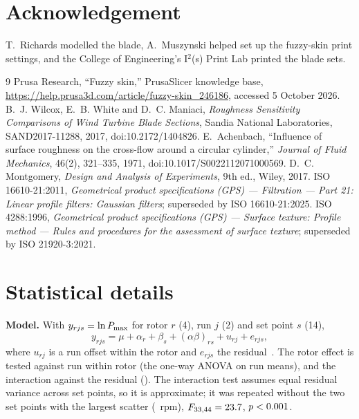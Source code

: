 \documentclass[11pt]{article}
\begin{document}
\section*{Acknowledgement}
T.~Richards modelled the blade, A.~Muszynski helped set up the fuzzy-skin print settings, and the
College of Engineering's I$^2$(s) Print Lab printed the blade sets.

{\small
\begin{thebibliography}{9}
 Prusa Research, ``Fuzzy skin,'' PrusaSlicer knowledge base,
\url{https://help.prusa3d.com/article/fuzzy-skin_246186}, accessed 5 October 2026.
 B.~J. Wilcox, E.~B. White and D.~C. Maniaci, \emph{Roughness Sensitivity
Comparisons of Wind Turbine Blade Sections}, Sandia National Laboratories, SAND2017-11288, 2017,
doi:10.2172/1404826.
 E.~Achenbach, ``Influence of surface roughness on the cross-flow around a
circular cylinder,'' \emph{Journal of Fluid Mechanics}, 46(2), 321--335, 1971,
doi:10.1017/S0022112071000569.
 D.~C. Montgomery, \emph{Design and Analysis of Experiments}, 9th ed., Wiley,
2017.
 ISO 16610-21:2011, \emph{Geometrical product specifications (GPS) --- Filtration
--- Part 21: Linear profile filters: Gaussian filters}; superseded by ISO 16610-21:2025.
 ISO 4288:1996, \emph{Geometrical product specifications (GPS) --- Surface texture:
Profile method --- Rules and procedures for the assessment of surface texture}; superseded by
ISO 21920-3:2021.
\end{thebibliography}}

\appendix

\section{Statistical details}\label{app:stats}
\textbf{Model.} With $y_{rjs}=\ln P_{\max}$ for rotor $r$ (4), run $j$ (2) and set point $s$ (14),
\[ y_{rjs} = \mu + \alpha_r + \beta_s + (\alpha\beta)_{rs} + u_{rj} + e_{rjs}, \]
where $u_{rj}$ is a run offset within the rotor and $e_{rjs}$ the residual~\cite{montgomery}. The
rotor effect is tested against run within rotor (the one-way ANOVA on run means), and the
interaction against the residual (). The interaction test assumes equal residual
variance across set points, so it is approximate; it was repeated without the two set points with
the largest scatter (\trimDropped~rpm), $F_{33,44}=23.7$, $p<0.001$.
\end{document}
